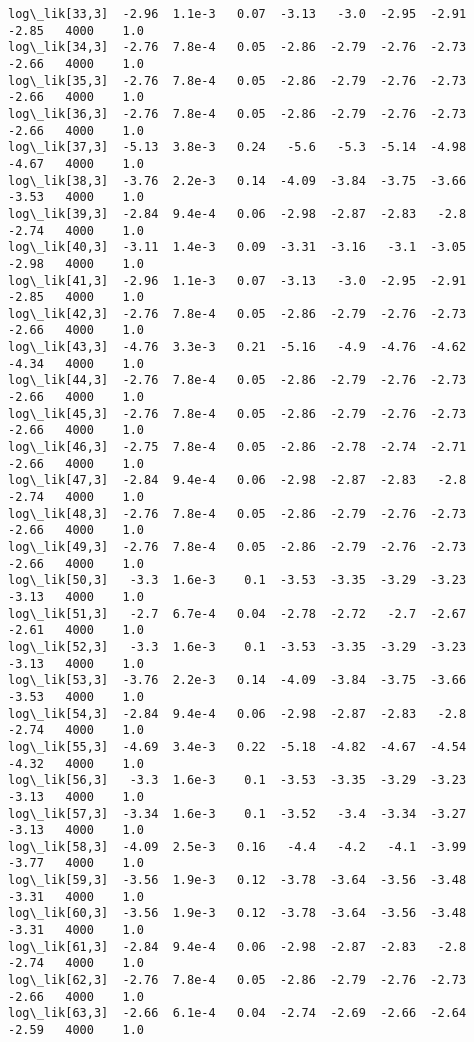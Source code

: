 \documentclass[11pt]{article}
\begin{document}
\begin{Verbatim}[commandchars=\\\{\}]
log\_lik[33,3]  -2.96  1.1e-3   0.07  -3.13   -3.0  -2.95  -2.91  -2.85   4000    1.0
log\_lik[34,3]  -2.76  7.8e-4   0.05  -2.86  -2.79  -2.76  -2.73  -2.66   4000    1.0
log\_lik[35,3]  -2.76  7.8e-4   0.05  -2.86  -2.79  -2.76  -2.73  -2.66   4000    1.0
log\_lik[36,3]  -2.76  7.8e-4   0.05  -2.86  -2.79  -2.76  -2.73  -2.66   4000    1.0
log\_lik[37,3]  -5.13  3.8e-3   0.24   -5.6   -5.3  -5.14  -4.98  -4.67   4000    1.0
log\_lik[38,3]  -3.76  2.2e-3   0.14  -4.09  -3.84  -3.75  -3.66  -3.53   4000    1.0
log\_lik[39,3]  -2.84  9.4e-4   0.06  -2.98  -2.87  -2.83   -2.8  -2.74   4000    1.0
log\_lik[40,3]  -3.11  1.4e-3   0.09  -3.31  -3.16   -3.1  -3.05  -2.98   4000    1.0
log\_lik[41,3]  -2.96  1.1e-3   0.07  -3.13   -3.0  -2.95  -2.91  -2.85   4000    1.0
log\_lik[42,3]  -2.76  7.8e-4   0.05  -2.86  -2.79  -2.76  -2.73  -2.66   4000    1.0
log\_lik[43,3]  -4.76  3.3e-3   0.21  -5.16   -4.9  -4.76  -4.62  -4.34   4000    1.0
log\_lik[44,3]  -2.76  7.8e-4   0.05  -2.86  -2.79  -2.76  -2.73  -2.66   4000    1.0
log\_lik[45,3]  -2.76  7.8e-4   0.05  -2.86  -2.79  -2.76  -2.73  -2.66   4000    1.0
log\_lik[46,3]  -2.75  7.8e-4   0.05  -2.86  -2.78  -2.74  -2.71  -2.66   4000    1.0
log\_lik[47,3]  -2.84  9.4e-4   0.06  -2.98  -2.87  -2.83   -2.8  -2.74   4000    1.0
log\_lik[48,3]  -2.76  7.8e-4   0.05  -2.86  -2.79  -2.76  -2.73  -2.66   4000    1.0
log\_lik[49,3]  -2.76  7.8e-4   0.05  -2.86  -2.79  -2.76  -2.73  -2.66   4000    1.0
log\_lik[50,3]   -3.3  1.6e-3    0.1  -3.53  -3.35  -3.29  -3.23  -3.13   4000    1.0
log\_lik[51,3]   -2.7  6.7e-4   0.04  -2.78  -2.72   -2.7  -2.67  -2.61   4000    1.0
log\_lik[52,3]   -3.3  1.6e-3    0.1  -3.53  -3.35  -3.29  -3.23  -3.13   4000    1.0
log\_lik[53,3]  -3.76  2.2e-3   0.14  -4.09  -3.84  -3.75  -3.66  -3.53   4000    1.0
log\_lik[54,3]  -2.84  9.4e-4   0.06  -2.98  -2.87  -2.83   -2.8  -2.74   4000    1.0
log\_lik[55,3]  -4.69  3.4e-3   0.22  -5.18  -4.82  -4.67  -4.54  -4.32   4000    1.0
log\_lik[56,3]   -3.3  1.6e-3    0.1  -3.53  -3.35  -3.29  -3.23  -3.13   4000    1.0
log\_lik[57,3]  -3.34  1.6e-3    0.1  -3.52   -3.4  -3.34  -3.27  -3.13   4000    1.0
log\_lik[58,3]  -4.09  2.5e-3   0.16   -4.4   -4.2   -4.1  -3.99  -3.77   4000    1.0
log\_lik[59,3]  -3.56  1.9e-3   0.12  -3.78  -3.64  -3.56  -3.48  -3.31   4000    1.0
log\_lik[60,3]  -3.56  1.9e-3   0.12  -3.78  -3.64  -3.56  -3.48  -3.31   4000    1.0
log\_lik[61,3]  -2.84  9.4e-4   0.06  -2.98  -2.87  -2.83   -2.8  -2.74   4000    1.0
log\_lik[62,3]  -2.76  7.8e-4   0.05  -2.86  -2.79  -2.76  -2.73  -2.66   4000    1.0
log\_lik[63,3]  -2.66  6.1e-4   0.04  -2.74  -2.69  -2.66  -2.64  -2.59   4000    1.0

\end{Verbatim}
\end{document}
